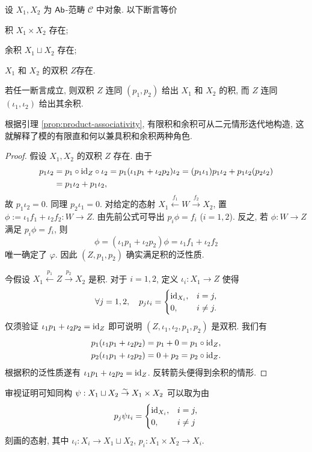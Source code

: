 \begin{theorem}\label{prop:biproduct-criterion}
	设 $X_1, X_2$ 为 $\mathsf{Ab}$-范畴 $\mathcal{C}$ 中对象. 以下断言等价
	\begin{compactenum}[(i)]
		\item 积 $X _1\times X_2$ 存在;
		\item 余积 $X_1 \sqcup X_2$ 存在;
		\item $X_1$ 和 $X_2$ 的双积 $Z$存在.
	\end{compactenum}
	若任一断言成立, 则双积 $Z$ 连同 $(p_1, p_2)$ 给出 $X_1$ 和 $X_2$ 的积, 而 $Z$ 连同 $(\iota_1, \iota_2)$ 给出其余积.
\end{theorem}
根据引理 \ref{prop:product-associativity}, 有限积和余积可从二元情形迭代地构造, 这就解释了模的有限直和何以兼具积和余积两种角色.
\begin{proof}
	假设 $X_1, X_2$ 的双积 $Z$ 存在. 由于
	\begin{align*}
		p_1 \iota_2 & = p_1 \circ \mathrm{id}_Z \circ \iota_2 =  p_1 (\iota_1 p_1 + \iota_2 p_2) \iota_2 = (p_1 \iota_1) p_1 \iota_2 + p_1 \iota_2 (p_2 \iota_2)  \\
		& = p_1 \iota_2 + p_1 \iota_2,
	\end{align*}
	故 $p_1 \iota_2 = 0$. 同理 $p_2 \iota_1 = 0$. 对给定的态射 $X_1 \xleftarrow{f_1} W \xrightarrow{f_2} X_2$, 置 $\phi := \iota_1 f_1 + \iota_2 f_2 : W \to Z$. 由先前公式可导出 $p_i \phi = f_i$ ($i=1,2$). 反之, 若 $\phi: W \to Z$ 满足 $p_i \phi = f_i$, 则
	\[ \phi = (\iota_1 p_1 + \iota_2 p_2) \phi = \iota_1 f_1 + \iota_2 f_2 \]
	唯一确定了 $\varphi$. 因此 $(Z, p_1, p_2)$ 确实满足积的泛性质.

	今假设 $X_1 \xleftarrow{p_1} Z \xrightarrow{p_2} X_2$ 是积. 对于 $i=1,2$, 定义 $\iota_i: X_1 \to Z$ 使得
	\[ \forall j=1,2, \quad  p_j \iota_i =
		\begin{cases}
			\mathrm{id}_{X_i}, & i=j, \\
			0, & i \neq j .
		\end{cases}
	\]
	仅须验证 $\iota_1 p_1 + \iota_2 p_2 = \mathrm{id}_Z$ 即可说明 $(Z, \iota_1, \iota_2, p_1, p_2)$ 是双积. 我们有
	\begin{align*}
		p_1 (\iota_1 p_1 + \iota_2 p_2) & = p_1 + 0 = p_1 \circ \mathrm{id}_Z , \\
		p_2 (\iota_1 p_1 + \iota_2 p_2) & = 0 + p_2 = p_2 \circ \mathrm{id}_Z.
	\end{align*}
	根据积的泛性质遂有 $\iota_1 p_1 + \iota_2 p_2 = \mathrm{id}_Z$. 反转箭头便得到余积的情形.
\end{proof}
\begin{remark}
	审视证明可知同构 $\psi: X_1 \sqcup X_2 \stackrel{\sim}{\rightarrow} X_1 \times X_2$ 可以取为由
	\[ p_j \psi \iota_i =
		\begin{cases}
			\mathrm{id}_{X_i}, & i=j, \\
			0, & i \neq j
		\end{cases} \]
	刻画的态射, 其中 $\iota_i : X_i \to X_1 \sqcup X_2$, $p_i: X_1 \times X_2 \to X_i$.
\end{remark}

